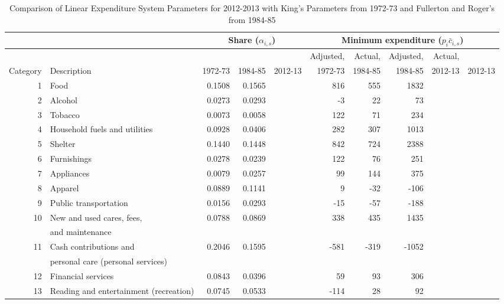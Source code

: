 \documentclass[article,11pt,letterpaper,fleqn]{article}
\theoremstyle{definition}
\numberwithin{equation}{section}
\begin{document}
\begin{table}[h!]
  \centering
  \caption{Comparison of Linear Expenditure System Parameters for 2012-2013 with King's Parameters from 1972-73 and Fullerton and Roger's from 1984-85}
    \begin{tabular}{rlrrrrrrrr}
    \hline
    \hline
          &       & \multicolumn{3}{c}{Share ($\alpha_{i,s}$)} & \multicolumn{5}{c}{Minimum expenditure ($p_{i}\bar{c}_{i,s}$)} \\
    \hline
       &  & & & &Adjusted,  & Actual, & Adjusted, & Actual,  \\
    Category & Description & 1972-73 & 1984-85 & 2012-13 & 1972-73 & 1984-85 & 1984-85 &  2012-13 & 2012-13 \\
    1     & Food  & 0.1508 & 0.1565 &       & 816   & 555   & 1832  &       &  \\
    2     & Alcohol & 0.0273 & 0.0293 &       & -3    & 22    & 73    &       &  \\
    3     & Tobacco & 0.0073 & 0.0058 &       & 122   & 71    & 234   &       &  \\
    4     & Household fuels and utilities & 0.0928 & 0.0406 &       & 282   & 307   & 1013  &       &  \\
    5     & Shelter & 0.1440 & 0.1448 &       & 842   & 724   & 2388  &       &  \\
    6     & Furnishings & 0.0278 & 0.0239 &       & 122   & 76    & 251   &       &  \\
    7     & Appliances & 0.0079 & 0.0257 &       & 99    & 144   & 375   &       &  \\
    8     & Apparel & 0.0889 & 0.1141 &       & 9     & -32   & -106  &       &  \\
    9     & Public transportation & 0.0156 & 0.0293 &       & -15   & -57   & -188  &       &  \\
    10    & New and used cares, fees,  & 0.0788 & 0.0869 &       & 338   & 435   & 1435  &       &  \\
     & and maintenance & & & & & & &  \\
    11    & Cash contributions and& 0.2046 & 0.1595 &       & -581  & -319  & -1052 &       &  \\
         &  personal care (personal services)  & & & & & & &  \\
    12    & Financial services & 0.0843 & 0.0396 &       & 59    & 93    & 306   &       &  \\
    13    & Reading and entertainment (recreation) & 0.0745 & 0.0533 &       & -114  & 28    & 92    &       &  \\

\end{tabular}
\end{table}
\end{document}
